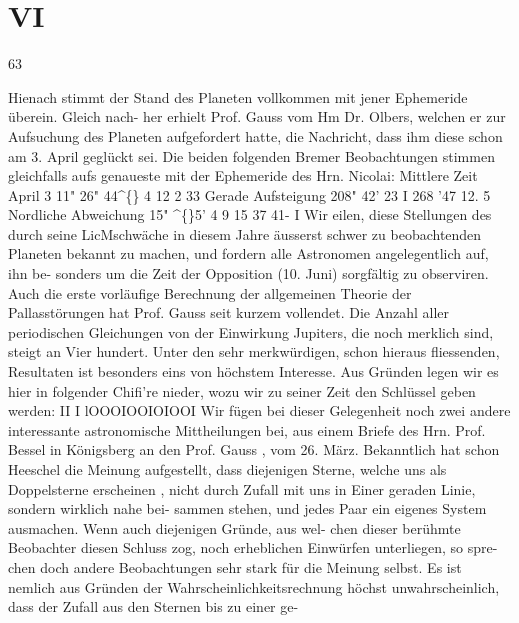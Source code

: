 \documentclass[12pt,a4paper]{article}
\begin{document}
\section*{VI}
63 


\newpage
Hienach  stimmt  der  Stand  des  Planeten  vollkommen  mit  jener  Ephemeride  überein.  Gleich  nach- 
her erhielt  Prof.  Gauss  vom  Hm  Dr.  Olbers,  welchen  er  zur  Aufsuchung  des  Planeten  aufgefordert 
hatte,  die  Nachricht,  dass  ihm  diese  schon  am  3.  April  geglückt  sei.  Die  beiden  folgenden  Bremer 
Beobachtungen  stimmen  gleichfalls  aufs  genaueste  mit  der  Ephemeride  des  Hrn.  Nicolai: 
Mittlere  Zeit 
April    3     11"  26"  44\textasciicircum\{\} 
4     12       2     33 
Gerade 
Aufsteigung 
208"  42'    23  I 
268    '47     12. 5 
Nordliche 
Abweichung 
15"  \textasciicircum\{\}5'      4  9 
15     37     41-  I 
Wir  eilen,  diese  Stellungen  des  durch  seine  LicMschwäche  in  diesem  Jahre  äusserst  schwer  zu 
beobachtenden  Planeten  bekannt  zu  machen,  und  fordern  alle  Astronomen  angelegentlich  auf,  ihn  be- 
sonders um  die  Zeit  der  Opposition  (10.  Juni)  sorgfältig  zu  observiren. 
Auch  die  erste  vorläufige  Berechnung  der  allgemeinen  Theorie  der  Pallasstörungen  hat  Prof.  Gauss 
seit  kurzem  vollendet.  Die  Anzahl  aller  periodischen  Gleichungen  von  der  Einwirkung  Jupiters,  die 
noch  merklich  sind,  steigt  an  Vier  hundert.  Unter  den  sehr  merkwürdigen,  schon  hieraus  fliessenden, 
Resultaten  ist  besonders  eins  von  höchstem  Interesse.  Aus  Gründen  legen  wir  es  hier  in  folgender  Chifi're 
nieder,  wozu  wir  zu  seiner  Zeit  den  Schlüssel  geben  werden: 
II I lOOOIOOIOIOOI 
Wir  fügen  bei  dieser  Gelegenheit  noch  zwei  andere  interessante  astronomische  Mittheilungen  bei, 
aus  einem  Briefe  des  Hrn.  Prof.  Bessel  in  Königsberg  an  den  Prof.  Gauss  ,  vom  26.  März. 
Bekanntlich  hat  schon  Heeschel  die  Meinung  aufgestellt,  dass  diejenigen  Sterne,  welche  uns  als 
Doppelsterne  erscheinen ,  nicht  durch  Zufall  mit  uns  in  Einer  geraden  Linie,  sondern  wirklich  nahe  bei- 
sammen stehen,  und  jedes  Paar  ein  eigenes  System  ausmachen.  Wenn  auch  diejenigen  Gründe,  aus  wel- 
chen dieser  berühmte  Beobachter  diesen  Schluss  zog,  noch  erheblichen  Einwürfen  unterliegen,  so  spre- 
chen doch  andere  Beobachtungen  sehr  stark  für  die  Meinung  selbst.  Es  ist  nemlich  aus  Gründen  der 
Wahrscheinlichkeitsrechnung  höchst  unwahrscheinlich,  dass  der  Zufall  aus  den  Sternen  bis  zu  einer  ge- 
\end{document}
